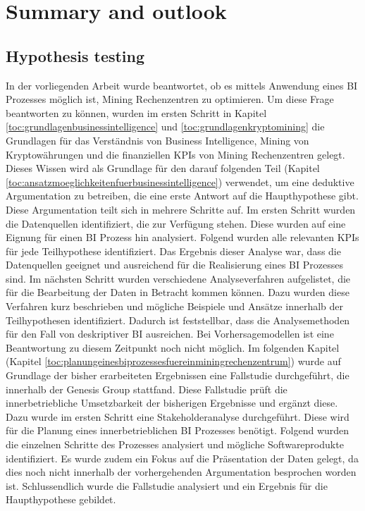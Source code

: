 \newpage
\section{Summary and outlook} \label{toc:zusammenfassungundausblick}

\subsection{Hypothesis testing} \label{toc:ueberpruefungderhypothesen}

In der vorliegenden Arbeit wurde beantwortet, ob es mittels Anwendung eines \ac{BI} Prozesses möglich ist,
Mining Rechenzentren zu optimieren. Um diese Frage beantworten zu können, wurden im ersten Schritt in Kapitel
\ref{toc:grundlagenbusinessintelligence} und \ref{toc:grundlagenkryptomining} die Grundlagen für das Verständnis
von Business Intelligence, Mining von Kryptowährungen und die finanziellen \acp{KPI} von Mining Rechenzentren
gelegt. Dieses Wissen wird als Grundlage für den darauf folgenden Teil (Kapitel \ref{toc:ansatzmoeglichkeitenfuerbusinessintelligence})
verwendet, um eine deduktive Argumentation zu betreiben, die eine erste Antwort auf die Haupthypothese gibt.
Diese Argumentation teilt sich in mehrere Schritte auf. Im ersten Schritt wurden die Datenquellen identifiziert,
die zur Verfügung stehen. Diese wurden auf eine Eignung für einen \ac{BI} Prozess hin analysiert. Folgend
wurden alle relevanten \acp{KPI} für jede Teilhypothese identifiziert. Das Ergebnis dieser Analyse war, dass
die Datenquellen geeignet und ausreichend für die Realisierung eines \ac{BI} Prozesses sind. Im nächsten Schritt
wurden verschiedene Analyseverfahren aufgelistet, die für die Bearbeitung der Daten in Betracht kommen können.
Dazu wurden diese Verfahren kurz beschrieben und mögliche Beispiele und Ansätze innerhalb der Teilhypothesen
identifiziert. Dadurch ist feststellbar, dass die Analysemethoden für den Fall von deskriptiver
\ac{BI} ausreichen. Bei Vorhersagemodellen ist eine Beantwortung zu diesem Zeitpunkt noch nicht möglich. Im folgenden Kapitel
(Kapitel \ref{toc:planungeinesbiprozessesfuereinminingrechenzentrum}) wurde auf Grundlage der bisher erarbeiteten
Ergebnissen eine Fallstudie durchgeführt, die innerhalb der Genesis Group stattfand. Diese Fallstudie
prüft die innerbetriebliche Umsetzbarkeit der bisherigen Ergebnisse und ergänzt diese. Dazu wurde im ersten Schritt
eine Stakeholderanalyse durchgeführt. Diese wird für die Planung eines innerbetrieblichen \ac{BI} Prozesses
benötigt. Folgend wurden die einzelnen Schritte des Prozesses analysiert und mögliche Softwareprodukte identifiziert.
Es wurde zudem ein Fokus auf die Präsentation der Daten gelegt, da dies noch nicht innerhalb der
vorhergehenden Argumentation besprochen worden ist. Schlussendlich wurde die Fallstudie analysiert und ein Ergebnis
für die Haupthypothese gebildet.

